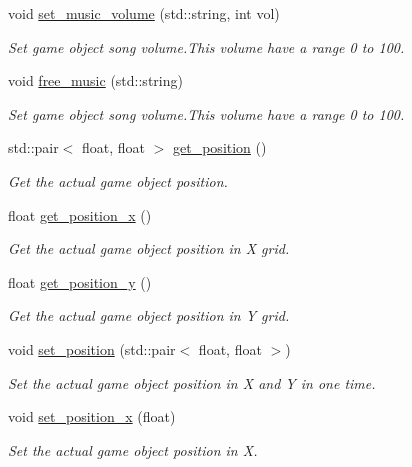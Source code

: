 \begin{DoxyCompactItemize}
void \hyperlink{classengine_1_1_game_object_a41ac469cb05369b5c25cbbf60df6638d}{set\+\_\+music\+\_\+volume} (std\+::string, int vol)
\begin{DoxyCompactList}\small\item\em Set game object song volume.\+This volume have a range 0 to 100. \end{DoxyCompactList}\item 
void \hyperlink{classengine_1_1_game_object_a1ce845a44c4ded5a8da397e00ea15e2c}{free\+\_\+music} (std\+::string)
\begin{DoxyCompactList}\small\item\em Set game object song volume.\+This volume have a range 0 to 100. \end{DoxyCompactList}\item 
std\+::pair$<$ float, float $>$ \hyperlink{classengine_1_1_game_object_a1b45a9a78d9d24bda7380a15645362f2}{get\+\_\+position} ()
\begin{DoxyCompactList}\small\item\em Get the actual game object position. \end{DoxyCompactList}\item 
float \hyperlink{classengine_1_1_game_object_a8897eb01abcb75b803977bd112586ca5}{get\+\_\+position\+\_\+x} ()
\begin{DoxyCompactList}\small\item\em Get the actual game object position in X grid. \end{DoxyCompactList}\item 
float \hyperlink{classengine_1_1_game_object_aebb20a31340dd04aae07079ddb63528d}{get\+\_\+position\+\_\+y} ()
\begin{DoxyCompactList}\small\item\em Get the actual game object position in Y grid. \end{DoxyCompactList}\item 
void \hyperlink{classengine_1_1_game_object_ada8fe8ebffd004fc9c37d3ea19b449ba}{set\+\_\+position} (std\+::pair$<$ float, float $>$)
\begin{DoxyCompactList}\small\item\em Set the actual game object position in X and Y in one time. \end{DoxyCompactList}\item 
void \hyperlink{classengine_1_1_game_object_acdb36a1aa18d98dc0d1d779b869c8e01}{set\+\_\+position\+\_\+x} (float)
\begin{DoxyCompactList}\small\item\em Set the actual game object position in X. \end{DoxyCompactList}\item 

\end{DoxyCompactItemize}
